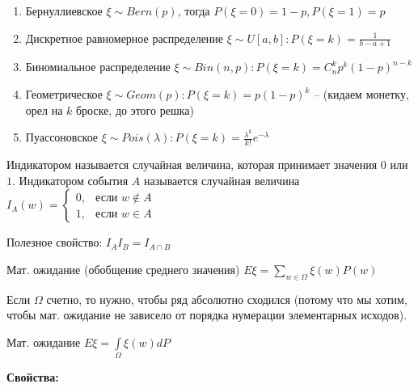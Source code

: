 \Examples
\begin{enumerate}
    \item Бернуллиевское $\xi \sim Bern(p)$, тогда $P(\xi = 0) = 1 - p, P(\xi = 1) = p$
    \item Дискретное равномерное распределение $\xi \sim U[a, b]: P(\xi = k) = \frac{1}{b - a + 1}$
    \item Биномиальное распределение $\xi \sim Bin(n, p): P(\xi = k) = C_n^kp^k(1 - p)^{n - k}$
    \item Геометрическое $\xi \sim Geom(p): P(\xi = k) = p(1 - p)^k$ -- (кидаем монетку, орел на $k$ броске, до этого решка)
    \item Пуассоновское $\xi \sim Pois(\lambda): P(\xi = k) = \frac{\lambda^k}{k!}e^{-\lambda}$
\end{enumerate}


\Def Индикатором называется случайная величина, которая принимает значения $0$ или $1$. Индикатором события $A$ называется случайная величина $I_A(w) = \begin{cases} 
0,  & \mbox{если } w\not\in A\\
1,  & \mbox{если } w \in A 
\end{cases}$

Полезное свойство: $I_AI_B = I_{A\cap B}$

\Def Мат. ожидание (обобщение среднего значения) $E \xi = \sum\limits_{w \in \Omega} \xi(w)P(w)$

\Note Если $\Omega$ счетно, то нужно, чтобы ряд абсолютно сходился (потому что мы хотим, чтобы мат. ожидание не зависело от порядка нумерации элементарных исходов).

\leftbar

\Def Мат. ожидание $E \xi = \int\limits_{\Omega}\xi(w)dP$
\endleftbar

\textbf{Свойства:}

